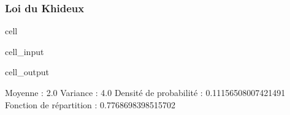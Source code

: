 \documentclass[letterpaper,10pt,english]{jupyterBook}
\begin{document}
\subsubsection{Loi du Khi\sphinxhyphen{}deux}
\label{\detokenize{elemstats:loi-du-khi-deux}}
\begin{sphinxuseclass}{cell}\begin{sphinxVerbatimInput}

\begin{sphinxuseclass}{cell_input}
\begin{sphinxVerbatim}[commandchars=\\\{\}]
   
    
  
 
 
 
\end{sphinxVerbatim}

\end{sphinxuseclass}\end{sphinxVerbatimInput}
\begin{sphinxVerbatimOutput}

\begin{sphinxuseclass}{cell_output}
\begin{sphinxVerbatim}[commandchars=\\\{\}]
Moyenne :  2.0
Variance :  4.0
Densité de probabilité :  0.11156508007421491
Fonction de répartition :  0.7768698398515702
\end{sphinxVerbatim}

\end{sphinxuseclass}\end{sphinxVerbatimOutput}

\end{sphinxuseclass}
\end{document}
